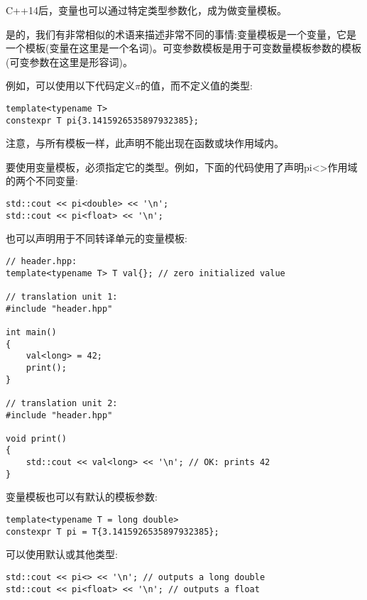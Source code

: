 C++14后，变量也可以通过特定类型参数化，成为做变量模板。

\begin{tcolorbox}[colback=webgreen!5!white,colframe=webgreen!75!black]
\hspace*{0.75cm}是的，我们有非常相似的术语来描述非常不同的事情:变量模板是一个变量，它是一个模板(变量在这里是一个名词)。可变参数模板是用于可变数量模板参数的模板(可变参数在这里是形容词)。
\end{tcolorbox}

例如，可以使用以下代码定义$\pi$的值，而不定义值的类型:

\begin{lstlisting}[style=styleCXX]
template<typename T>
constexpr T pi{3.1415926535897932385};
\end{lstlisting}

注意，与所有模板一样，此声明不能出现在函数或块作用域内。

要使用变量模板，必须指定它的类型。例如，下面的代码使用了声明pi<>作用域的两个不同变量:

\begin{lstlisting}[style=styleCXX]
std::cout << pi<double> << '\n';
std::cout << pi<float> << '\n';
\end{lstlisting}

也可以声明用于不同转译单元的变量模板:

\begin{lstlisting}[style=styleCXX]
// header.hpp:
template<typename T> T val{}; // zero initialized value

// translation unit 1:
#include "header.hpp"

int main()
{
	val<long> = 42;
	print();
}

// translation unit 2:
#include "header.hpp"

void print()
{
	std::cout << val<long> << '\n'; // OK: prints 42
}
\end{lstlisting}

变量模板也可以有默认的模板参数:

\begin{lstlisting}[style=styleCXX]
template<typename T = long double>
constexpr T pi = T{3.1415926535897932385};
\end{lstlisting}

可以使用默认或其他类型:

\begin{lstlisting}[style=styleCXX]
std::cout << pi<> << '\n'; // outputs a long double
std::cout << pi<float> << '\n'; // outputs a float
\end{lstlisting}

